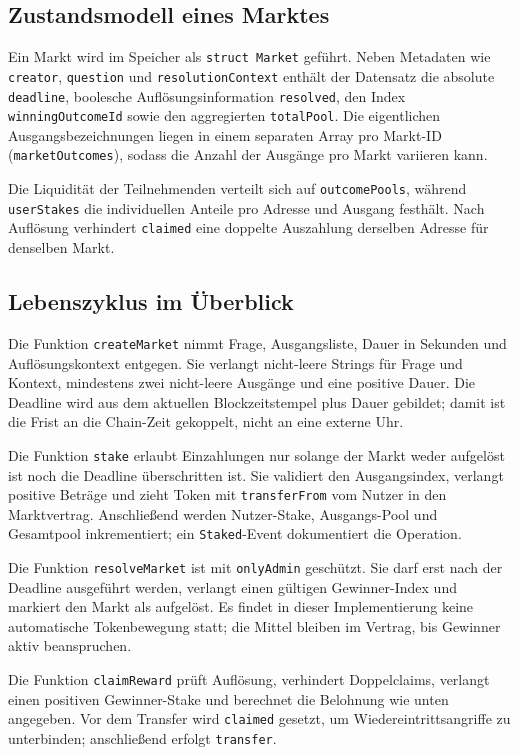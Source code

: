 \subsection{Zustandsmodell eines Marktes}

Ein Markt wird im Speicher als \texttt{struct Market} geführt. Neben Metadaten wie
\texttt{creator}, \texttt{question} und \texttt{resolutionContext} enthält der
Datensatz die absolute \texttt{deadline}, boolesche Auflösungsinformation
\texttt{resolved}, den Index \texttt{winningOutcomeId} sowie den aggregierten
\texttt{totalPool}. Die eigentlichen Ausgangsbezeichnungen liegen in einem
separaten Array pro Markt-ID (\texttt{marketOutcomes}), sodass die Anzahl der
Ausgänge pro Markt variieren kann.

Die Liquidität der Teilnehmenden verteilt sich auf \texttt{outcomePools}, während
\texttt{userStakes} die individuellen Anteile pro Adresse und Ausgang festhält.
Nach Auflösung verhindert \texttt{claimed} eine doppelte Auszahlung derselben
Adresse für denselben Markt.

\subsection{Lebenszyklus im Überblick}

Die Funktion \texttt{createMarket} nimmt Frage, Ausgangsliste, Dauer in Sekunden
und Auflösungskontext entgegen. Sie verlangt nicht-leere Strings für Frage und
Kontext, mindestens zwei nicht-leere Ausgänge und eine positive Dauer. Die
Deadline wird aus dem aktuellen Blockzeitstempel plus Dauer gebildet; damit ist
die Frist an die Chain-Zeit gekoppelt, nicht an eine externe Uhr.

Die Funktion \texttt{stake} erlaubt Einzahlungen nur solange der Markt weder
aufgelöst ist noch die Deadline überschritten ist. Sie validiert den
Ausgangsindex, verlangt positive Beträge und zieht Token mit
\texttt{transferFrom} vom Nutzer in den Marktvertrag. Anschließend werden
Nutzer-Stake, Ausgangs-Pool und Gesamtpool inkrementiert; ein \texttt{Staked}-Event
dokumentiert die Operation.

Die Funktion \texttt{resolveMarket} ist mit \texttt{onlyAdmin} geschützt. Sie
darf erst nach der Deadline ausgeführt werden, verlangt einen gültigen
Gewinner-Index und markiert den Markt als aufgelöst. Es findet in dieser
Implementierung keine automatische Tokenbewegung statt; die Mittel bleiben im
Vertrag, bis Gewinner aktiv beanspruchen.

Die Funktion \texttt{claimReward} prüft Auflösung, verhindert Doppelclaims,
verlangt einen positiven Gewinner-Stake und berechnet die Belohnung wie unten
angegeben. Vor dem Transfer wird \texttt{claimed} gesetzt, um
Wiedereintrittsangriffe zu unterbinden; anschließend erfolgt \texttt{transfer}.

